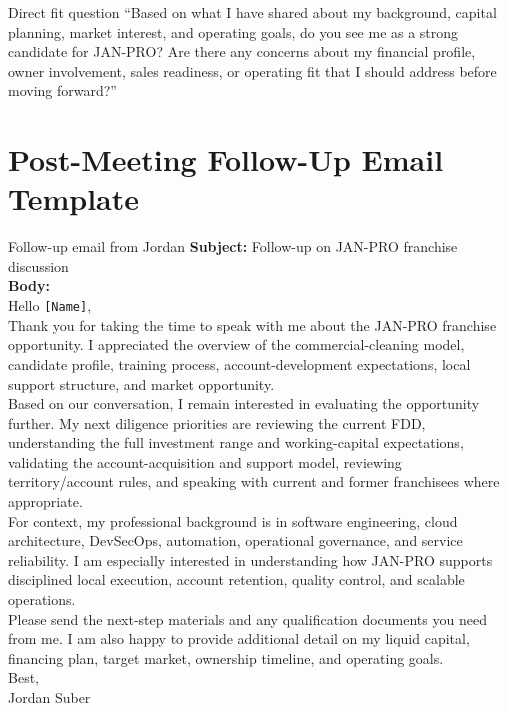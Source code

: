 \documentclass[11pt]{article}
\newcommand{\placeholder}[1]{\textcolor{accent}{\texttt{[#1]}}}
\newcommand{\janpro}{JAN-PRO}
\begin{document}
\begin{scriptbox}{Direct fit question}
``Based on what I have shared about my background, capital planning, market interest, and operating goals, do you see me as a strong candidate for \janpro{}? Are there any concerns about my financial profile, owner involvement, sales readiness, or operating fit that I should address before moving forward?''
\end{scriptbox}

\section{Post-Meeting Follow-Up Email Template}

\begin{scriptbox}{Follow-up email from Jordan}
\textbf{Subject:} Follow-up on \janpro{} franchise discussion\\[0.4em]
\textbf{Body:}\\
Hello \placeholder{Name},\\[0.25em]
Thank you for taking the time to speak with me about the \janpro{} franchise opportunity. I appreciated the overview of the commercial-cleaning model, candidate profile, training process, account-development expectations, local support structure, and market opportunity.\\[0.25em]
Based on our conversation, I remain interested in evaluating the opportunity further. My next diligence priorities are reviewing the current FDD, understanding the full investment range and working-capital expectations, validating the account-acquisition and support model, reviewing territory/account rules, and speaking with current and former franchisees where appropriate.\\[0.25em]
For context, my professional background is in software engineering, cloud architecture, DevSecOps, automation, operational governance, and service reliability. I am especially interested in understanding how \janpro{} supports disciplined local execution, account retention, quality control, and scalable operations.\\[0.25em]
Please send the next-step materials and any qualification documents you need from me. I am also happy to provide additional detail on my liquid capital, financing plan, target market, ownership timeline, and operating goals.\\[0.25em]
Best,\\
Jordan Suber
\end{scriptbox}
\end{document}
